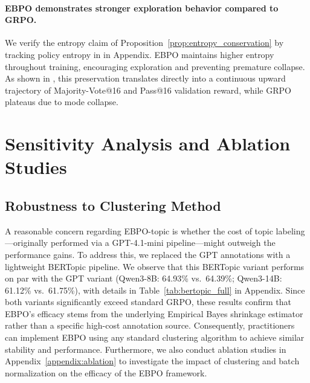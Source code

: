 \documentclass{article}
\theoremstyle{plain}
\theoremstyle{definition}
\theoremstyle{remark}
\newcommand{\ours}{\textsc{EBPO}\xspace}
\begin{document}
\paragraph{\ours demonstrates stronger exploration behavior compared to GRPO.}
We verify the entropy claim of Proposition~\ref{prop:entropy_conservation} by tracking policy entropy in  in Appendix. \ours maintains higher entropy throughout training, encouraging exploration and preventing premature collapse. As shown in , this preservation translates directly into a continuous upward trajectory of Majority-Vote@16 and Pass@16 validation reward, while GRPO plateaus due to mode collapse.

\section{Sensitivity Analysis and Ablation Studies}

\subsection{Robustness to Clustering Method}
\label{sec:clustering_robustness}

A reasonable concern regarding \ours-topic is whether the cost of topic labeling---originally performed via a GPT-4.1-mini pipeline---might outweigh the performance gains. To address this, we replaced the GPT annotations with a lightweight BERTopic pipeline. We observe that this BERTopic variant performs on par with the GPT variant (Qwen3-8B: 64.93\% vs.\ 64.39\%; Qwen3-14B: 61.12\% vs.\ 61.75\%), with details in Table~\ref{tab:bertopic_full} in Appendix. Since both variants significantly exceed standard GRPO, these results confirm that EBPO's efficacy stems from the underlying Empirical Bayes shrinkage estimator rather than a specific high-cost annotation source. Consequently, practitioners can implement EBPO using any standard clustering algorithm to achieve similar stability and performance. Furthermore, we also conduct ablation studies in Appendix~\ref{appendix:ablation} to investigate the impact of clustering and batch normalization on the efficacy of the \ours framework.



\end{document}

